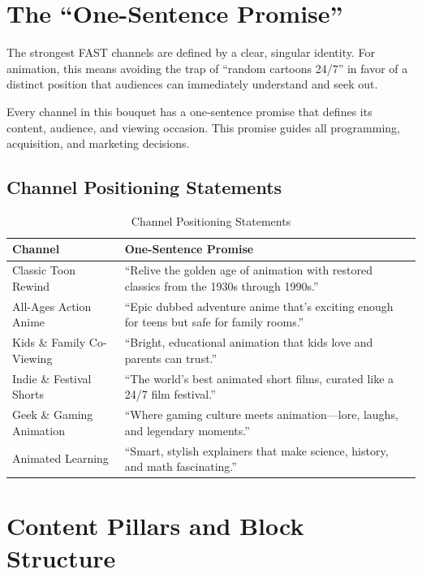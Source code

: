 \documentclass[12pt,letterpaper,twoside]{report}
\begin{document}
\section{The ``One-Sentence Promise''}

The strongest FAST channels are defined by a clear, singular identity. For animation, this means avoiding the trap of ``random cartoons 24/7'' in favor of a distinct position that audiences can immediately understand and seek out.

\begin{keypoint}
Every channel in this bouquet has a one-sentence promise that defines its content, audience, and viewing occasion. This promise guides all programming, acquisition, and marketing decisions.
\end{keypoint}

\subsection{Channel Positioning Statements}

\begin{table}[H]
\centering
\caption{Channel Positioning Statements}
\label{tab:positioning}
\begin{tabular}{@{}L{3.5cm}L{10cm}@{}}
\toprule
\textbf{Channel} & \textbf{One-Sentence Promise} \\
\midrule
Classic Toon Rewind & ``Relive the golden age of animation with restored classics from the 1930s through 1990s.'' \\
\addlinespace
All-Ages Action Anime & ``Epic dubbed adventure anime that's exciting enough for teens but safe for family rooms.'' \\
\addlinespace
Kids \& Family Co-Viewing & ``Bright, educational animation that kids love and parents can trust.'' \\
\addlinespace
Indie \& Festival Shorts & ``The world's best animated short films, curated like a 24/7 film festival.'' \\
\addlinespace
Geek \& Gaming Animation & ``Where gaming culture meets animation---lore, laughs, and legendary moments.'' \\
\addlinespace
Animated Learning & ``Smart, stylish explainers that make science, history, and math fascinating.'' \\
\bottomrule
\end{tabular}
\end{table}

\section{Content Pillars and Block Structure}
\end{document}
